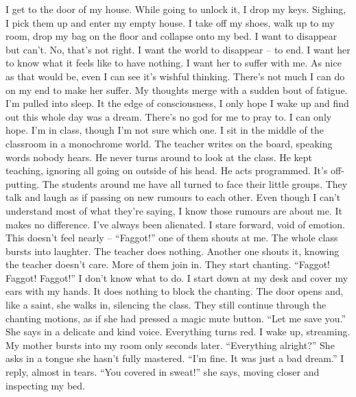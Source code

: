 \documentclass[a4paper, 12pt]{book}
\begin{document}
\begin{CJK*}{UTF8}{min}
\newline
\tab
I get to the door of my house. While going to unlock it, I drop my keys. Sighing, I pick them up and enter my empty house. I take off my shoes, walk up to my room, drop my bag on the floor and collapse onto my bed. I want to disappear but can’t. No, that’s not right. I want the world to disappear -- to end. I want her to know what it feels like to have nothing. I want her to suffer with me.
\newline
\tab
As nice as that would be, even I can see it’s wishful thinking. There’s not much I can do on my end to make her suffer. My thoughts merge with a sudden bout of fatigue. I’m pulled into sleep. It the edge of consciousness, I only hope I wake up and find out this whole day was a dream. There’s no god for me to pray to. I can only hope. 
\newline
\tab
I’m in class, though I’m not sure which one. I sit in the middle of the classroom in a monochrome world. The teacher writes on the board, speaking words nobody hears. He never turns around to look at the class. He kept teaching, ignoring all going on outside of his head. He acts programmed. It’s off-putting. The students around me have all turned to face their little groups. They talk and laugh as if passing on new rumours to each other. Even though I can’t understand most of what they’re saying, I know those rumours are about me. It makes no difference. I’ve always been alienated. I stare forward, void of emotion. This doesn’t feel nearly -- ``Faggot!'' one of them shouts at me. The whole class bursts into laughter. The teacher does nothing. Another one shouts it, knowing the teacher doesn’t care. More of them join in. They start chanting. ``Faggot! Faggot! Faggot!'' I don’t know what to do. I start down at my desk and cover my ears with my hands. It does nothing to block the chanting. The door opens and, like a saint, she walks in, silencing the class. They still continue through the chanting motions, as if she had pressed a magic mute button. ``Let me save you.'' She says in a delicate and kind voice. Everything turns red.
\newline
\tab
I wake up, streaming. My mother bursts into my room only seconds later. ``Everything alright?'' She asks in a tongue she hasn’t fully mastered.
\newline
\tab
``I’m fine. It was just a bad dream.'' I reply, almost in tears.
\newline
\tab
``You covered in sweat!'' she says, moving closer and inspecting my bed. 
\newline

\end{CJK*}
\end{document}
